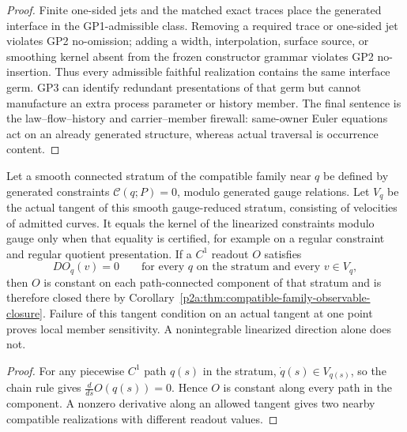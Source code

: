 \documentclass[12pt,a4paper]{article}
\begin{document}
\begin{proof}
Finite one-sided jets and the matched exact traces place the generated
interface in the GP1-admissible class.  Removing a required trace or one-sided
jet violates GP2 no-omission; adding a width, interpolation, surface source,
or smoothing kernel absent from the frozen constructor grammar violates GP2
no-insertion.  Thus every admissible faithful realization contains the same
interface germ.  GP3 can identify redundant presentations of that germ but
cannot manufacture an extra process parameter or history member.  The final
sentence is the law--flow--history and carrier--member firewall: same-owner
Euler equations act on an already generated structure, whereas actual
traversal is occurrence content.
\end{proof}

\begin{corollary}
\label{p2a:cor:local-observable-insensitivity}
Let a smooth connected stratum of the compatible family near $q$ be defined
by generated constraints $\mathcal C(q;P)=0$, modulo generated gauge
relations. Let $V_q$ be the actual tangent of this smooth gauge-reduced
stratum, consisting of velocities of admitted curves. It equals the kernel
of the linearized constraints modulo gauge only when that equality is
certified, for example on a regular constraint and regular quotient
presentation. If a
$C^1$ readout $O$ satisfies
\[
  D O_q(v)=0\qquad\text{for every }q\text{ on the stratum and every }v\in V_q,
\]
then $O$ is constant on each path-connected component of that stratum and is
therefore closed there by
Corollary~\ref{p2a:thm:compatible-family-observable-closure}.  Failure of this
tangent condition on an actual tangent at one point proves local member
sensitivity. A nonintegrable linearized direction alone does not.
\end{corollary}

\begin{proof}
For any piecewise $C^1$ path $q(s)$ in the stratum,
$\dot q(s)\in V_{q(s)}$, so the chain rule gives
$\frac{d}{ds}O(q(s))=0$.  Hence $O$ is constant along every path in the
component.  A nonzero derivative along an allowed tangent gives two nearby
compatible realizations with different readout values.
\end{proof}
\end{document}
